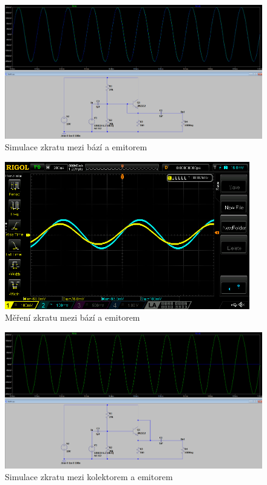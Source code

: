 \documentclass{article}
\begin{document}

\begin{figure}[H]
  \centering
  \includegraphics[width=\textwidth]{sim/ukol2/porucha4.png}
  \caption{Simulace zkratu mezi bází a emitorem}
  \label{fig:sch-sc-p5}
\end{figure}

\begin{figure}[H]
  \centering
  \includegraphics[width=0.95\textwidth]{mereni/NewFolder1/NewFile2.png}
  \caption{Měření zkratu mezi bází a emitorem}
  \label{fig:m-sch-sc-p5}
\end{figure}


\begin{figure}[H]
  \centering
  \includegraphics[width=\textwidth]{sim/ukol2/porucha5.png}
  \caption{Simulace zkratu mezi kolektorem a emitorem}
  \label{fig:sch-sc-p6}
\end{figure}
\end{document}

